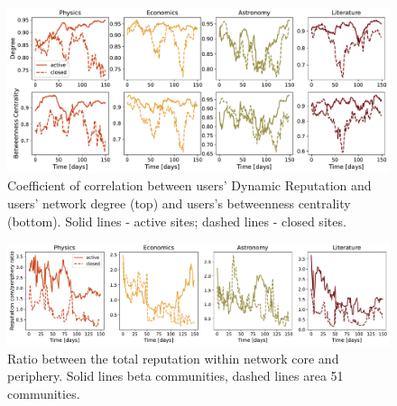 \begin{figure}[h!]
	\centering
	\includegraphics[width=\linewidth]{figures/stackexchange/correlations.pdf}
	\caption{Coefficient of correlation between users' Dynamic Reputation and users' network degree (top) and users's betweenness centrality (bottom). Solid lines - active sites; dashed lines - closed sites.}
	\label{fig:dyn_rep_centrality}
\end{figure}

\begin{figure}[h!]
	\centering
	\includegraphics[width=\linewidth]{figures/stackexchange/core_per_ratio_reputation.pdf}
	\caption{Ratio between the total reputation within network core and periphery. Solid lines beta communities, dashed lines area 51 communities.}
	\label{fig:dr_core_per}
\end{figure}
